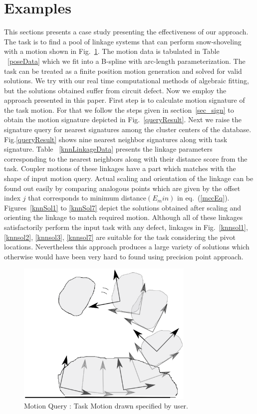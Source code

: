 \documentclass[twocolumn,10pt]{asme2e}
\newcommand{\req}[1]{(\ref{#1})}
\begin{document}
\section{Examples}\label{sec_example}
This sections presents a case study presenting the effectiveness of our approach.
The task is to find a pool of linkage systems that can perform snow-shoveling with a motion shown in Fig.~\ref{motionQuery}.
The motion data is tabulated in Table ~\ref{poseData} which we fit into a B-spline with arc-length parameterization.
The task can be treated as a finite position motion generation and solved for valid solutions.
We try with our real time computational methods of algebraic fitting\cite{generalfitting-JCISE},\cite{deshpande2017} but the solutions obtained suffer from circuit defect.
Now we employ the approach presented in this paper.
First step is to calculate motion signature of the task motion.
For that we follow the steps given in section~\ref{sec_sign} to obtain the motion signature depicted in Fig.~\ref{queryResult}.
Next we raise the signature query for nearest signatures among the cluster centers of the database.
Fig.\ref{queryResult} shows nine nearest neighbor signatures along with task signature.
Table ~\ref{knnLinkageData} presents the linkage parameters corresponding to the nearest neighbors along with their distance score from the task.
Coupler motions of these linkages have a part which matches with the shape of input motion query.
Actual scaling and orientation of the linkage can be found out easily by comparing analogous points which are given by the offset index $j$ that corresponds to minimum distance$(E_min)$ in eq.~\req{mccEq}.
Figures~\ref{knnSol1} to \ref{knnSol7} depict the solutions obtained after scaling and orienting the linkage to match required motion.
Although all of these linkages satisfactorily perform the input task with any defect, linkages in Fig.~\ref{knnsol1}, \ref{knnsol2}, \ref{knnsol3}, \ref{knnsol7} are suitable for the task considering the pivot locations.
Nevertheless this approach produces a large variety of solutions which otherwise would have been very hard to found using precision point approach.

\begin{figure}
\centering
\includegraphics[width=240pt]{figure/fig_motion_query.eps}
  \caption{Motion Query : Task Motion drawn specified by user.}
\label{motionQuery}
\end{figure}
\end{document}
